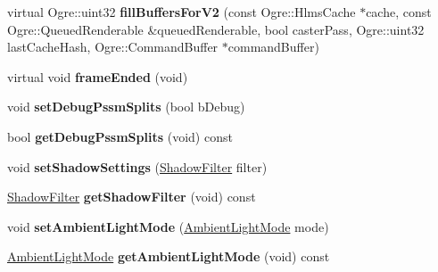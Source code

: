 \begin{DoxyCompactItemize}
\item 
\mbox{\label{class_hlms_terrain_a7d27ef9505eff026ef868e6891ca7b8f}} 
virtual Ogre\+::uint32 {\bfseries fill\+Buffers\+For\+V2} (const Ogre\+::\+Hlms\+Cache $\ast$cache, const Ogre\+::\+Queued\+Renderable \&queued\+Renderable, bool caster\+Pass, Ogre\+::uint32 last\+Cache\+Hash, Ogre\+::\+Command\+Buffer $\ast$command\+Buffer)
\item 
\mbox{\label{class_hlms_terrain_a7881dc3fd7d2834d6d16dbc8c308977a}} 
virtual void {\bfseries frame\+Ended} (void)
\item 
\mbox{\label{class_hlms_terrain_aaff666af525179d6f5a801ce8954f943}} 
void {\bfseries set\+Debug\+Pssm\+Splits} (bool b\+Debug)
\item 
\mbox{\label{class_hlms_terrain_a75deb2f268e6dd0fd44e1341d5e5cf2b}} 
bool {\bfseries get\+Debug\+Pssm\+Splits} (void) const
\item 
\mbox{\label{class_hlms_terrain_a5875cf6ae08dd761a9d905d19c08673a}} 
void {\bfseries set\+Shadow\+Settings} (\hyperlink{class_hlms_terrain_a241597775a6a483a2ba6cd02721d3715}{Shadow\+Filter} filter)
\item 
\mbox{\label{class_hlms_terrain_aae33eff84badc7f7d6e0c4f532aa227d}} 
\hyperlink{class_hlms_terrain_a241597775a6a483a2ba6cd02721d3715}{Shadow\+Filter} {\bfseries get\+Shadow\+Filter} (void) const
\item 
\mbox{\label{class_hlms_terrain_a0370831def02917269cc815bcfc974c6}} 
void {\bfseries set\+Ambient\+Light\+Mode} (\hyperlink{class_hlms_terrain_a49e72052d5ccdc3b34459069c4496a49}{Ambient\+Light\+Mode} mode)
\item 
\mbox{\label{class_hlms_terrain_a8d7e6ab8279b7eae6d7d44179ba8bbab}} 
\hyperlink{class_hlms_terrain_a49e72052d5ccdc3b34459069c4496a49}{Ambient\+Light\+Mode} {\bfseries get\+Ambient\+Light\+Mode} (void) const
\end{DoxyCompactItemize}
